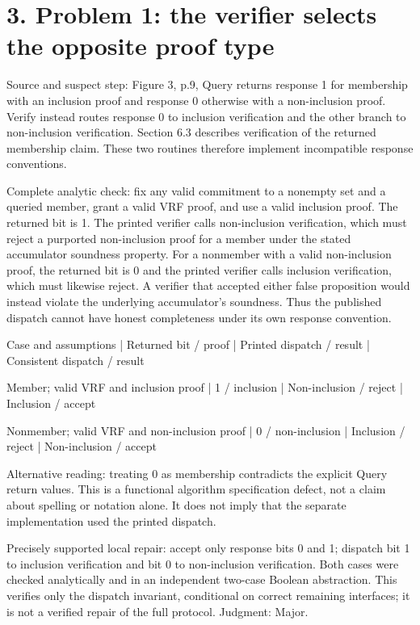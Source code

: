 \documentclass[10pt]{article}
\begin{document}
\section*{3. Problem 1: the verifier selects the opposite proof type}
Source and suspect step: Figure 3, p.9, Query returns response 1 for membership with an inclusion proof and response 0 otherwise with a non-inclusion proof. Verify instead routes response 0 to inclusion verification and the other branch to non-inclusion verification. Section 6.3 describes verification of the returned membership claim. These two routines therefore implement incompatible response conventions.\par
Complete analytic check: fix any valid commitment to a nonempty set and a queried member, grant a valid VRF proof, and use a valid inclusion proof. The returned bit is 1. The printed verifier calls non-inclusion verification, which must reject a purported non-inclusion proof for a member under the stated accumulator soundness property. For a nonmember with a valid non-inclusion proof, the returned bit is 0 and the printed verifier calls inclusion verification, which must likewise reject. A verifier that accepted either false proposition would instead violate the underlying accumulator’s soundness. Thus the published dispatch cannot have honest completeness under its own response convention.\par
Case and assumptions | Returned bit / proof | Printed dispatch / result | Consistent dispatch / result\par
Member; valid VRF and inclusion proof | 1 / inclusion | Non-inclusion / reject | Inclusion / accept\par
Nonmember; valid VRF and non-inclusion proof | 0 / non-inclusion | Inclusion / reject | Non-inclusion / accept\par
Alternative reading: treating 0 as membership contradicts the explicit Query return values. This is a functional algorithm specification defect, not a claim about spelling or notation alone. It does not imply that the separate implementation used the printed dispatch.\par
Precisely supported local repair: accept only response bits 0 and 1; dispatch bit 1 to inclusion verification and bit 0 to non-inclusion verification. Both cases were checked analytically and in an independent two-case Boolean abstraction. This verifies only the dispatch invariant, conditional on correct remaining interfaces; it is not a verified repair of the full protocol. Judgment: Major.\par
\end{document}
